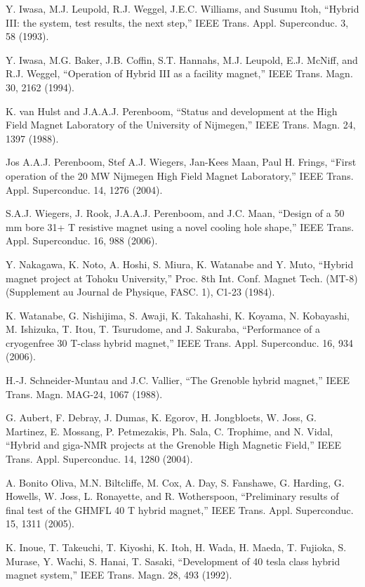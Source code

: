 \noindent [3.17] Y. Iwasa, M.J. Leupold, R.J. Weggel, J.E.C. Williams, and Susumu Itoh, ``Hybrid III: the system, test results, the next step,” IEEE Trans. Appl. Superconduc. 3, 58 (1993).

\noindent [3.18] Y. Iwasa, M.G. Baker, J.B. Coffin, S.T. Hannahs, M.J. Leupold, E.J. McNiff, and
R.J. Weggel, ``Operation of Hybrid III as a facility magnet,” IEEE Trans. Magn.
30, 2162 (1994).

\noindent [3.19] K. van Hulst and J.A.A.J. Perenboom, ``Status and development at the High Field Magnet Laboratory of the University of Nijmegen,” IEEE Trans. Magn. 24, 1397
(1988).

\noindent [3.20] Jos A.A.J. Perenboom, Stef A.J. Wiegers, Jan-Kees Maan, Paul H. Frings, ``First
operation of the 20 MW Nijmegen High Field Magnet Laboratory,” IEEE Trans.
Appl. Superconduc. 14, 1276 (2004).

\noindent [3.21] S.A.J. Wiegers, J. Rook, J.A.A.J. Perenboom, and J.C. Maan, ``Design of a 50 mm bore 31+ T resistive magnet using a novel cooling hole shape,” IEEE Trans. Appl.
Superconduc. 16, 988 (2006).

\noindent [3.22] Y. Nakagawa, K. Noto, A. Hoshi, S. Miura, K. Watanabe and Y. Muto, ``Hybrid
magnet project at Tohoku University,” Proc. 8th Int. Conf. Magnet Tech. (MT-8)
(Supplement au Journal de Physique, FASC. 1), C1-23 (1984).

\noindent [3.23] K. Watanabe, G. Nishijima, S. Awaji, K. Takahashi, K. Koyama, N. Kobayashi,
M. Ishizuka, T. Itou, T. Tsurudome, and J. Sakuraba, ``Performance of a cryogenfree
30 T-class hybrid magnet,” IEEE Trans. Appl. Superconduc. 16, 934 (2006).

\noindent [3.24] H.-J. Schneider-Muntau and J.C. Vallier, ``The Grenoble hybrid magnet,” IEEE
Trans. Magn. MAG-24, 1067 (1988).

\noindent [3.25] G. Aubert, F. Debray, J. Dumas, K. Egorov, H. Jongbloets, W. Joss, G. Martinez,
E. Mossang, P. Petmezakis, Ph. Sala, C. Trophime, and N. Vidal, ``Hybrid and
giga-NMR projects at the Grenoble High Magnetic Field,” IEEE Trans. Appl.
Superconduc. 14, 1280 (2004).

\noindent [3.26] A. Bonito Oliva, M.N. Biltcliffe, M. Cox, A. Day, S. Fanshawe, G. Harding, G. Howells, W. Joss, L. Ronayette, and R. Wotherspoon, ``Preliminary results of final test
of the GHMFL 40 T hybrid magnet,” IEEE Trans. Appl. Superconduc. 15, 1311
(2005).

\noindent [3.27] K. Inoue, T. Takeuchi, T. Kiyoshi, K. Itoh, H. Wada, H. Maeda, T. Fujioka,
S. Murase, Y. Wachi, S. Hanai, T. Sasaki, ``Development of 40 tesla class hybrid
magnet system,” IEEE Trans. Magn. 28, 493 (1992).

